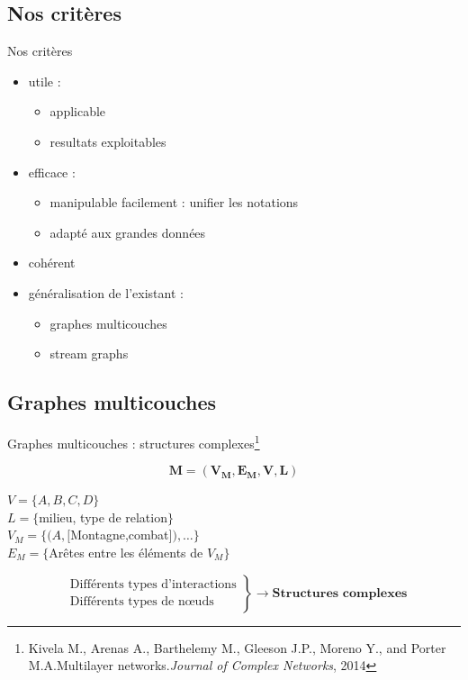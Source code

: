\documentclass[15pt]{beamer}
\def \stgs {stream graphs}
\begin{document}
\subsection{Nos critères}
\begin{frame}{Nos critères}
	\begin{itemize}
		\item utile : \begin{itemize}
							\item applicable
							\item resultats exploitables
						\end{itemize}		 \pause
		\item efficace : \begin{itemize}
							\item manipulable \og facilement \fg{} : unifier les notations
							\item adapté aux grandes données
						\end{itemize}\pause
		\item cohérent \pause
		\item généralisation de l'existant : 
			\begin{itemize}
				\item graphes multicouches
				\item \stgs{}
			\end{itemize}
	\end{itemize}
\end{frame}

\subsection{Graphes multicouches}
\begin{frame}{Graphes multicouches : structures complexes\footnote{Kivela M., Arenas A., Barthelemy M., Gleeson J.P., Moreno Y., and Porter M.A.Multilayer networks.\textit{Journal of Complex Networks}, 2014}}

\begin{minipage}{0.4\textwidth}
	$$\mathbf{M=(V_M,E_M,V,L)}$$
\begin{footnotesize}
$V = \{A,B,C,D\}$\\
$L = \{$milieu, type de relation$\}$\\
$V_M = \{(A,[$Montagne,combat$]), \dots \}$\\
$E_M = \{$Arêtes entre les éléments de $V_M \}$
\end{footnotesize}
\end{minipage}
\begin{minipage}[r]{0.59\textwidth}
\begin{figure}
    \flushright
    
\end{figure}
\end{minipage}
$$
\left.
\begin{array}{l}
    \text{ Différents types d'interactions}\\
    \text{ Différents types de n\oe{}uds}
\end{array}
\right \}\rightarrow \textbf{Structures complexes}
$$

\end{frame}
\end{document}
